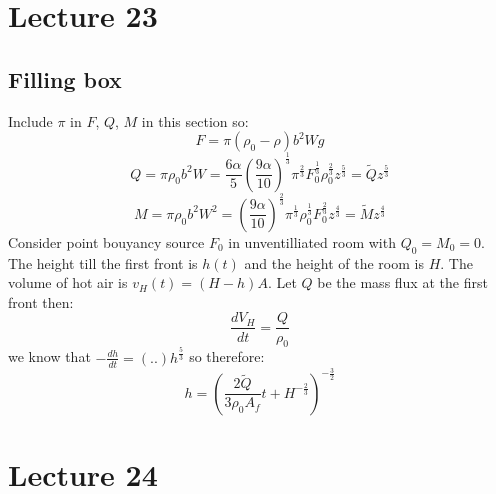 \documentclass{article}
\begin{document}
\section{Lecture 23}
\subsection{Filling box}
Include $\pi$ in $F$, $Q$, $M$ in this section so:
$$
 F= \pi ( \rho_0 - \rho) b^2 W g
$$
$$
 Q = \pi \rho_0 b^2 W = \frac{6 \alpha}{5} ( \frac{9 \alpha}{10})^{\frac{1}{3}} \pi^{\frac{2}{3}}F_0^{\frac{1}{3}} \rho_0^{ \frac{2}{3}} z^{\frac{5}{3}} = \tilde Q z^{\frac{5}{3}}
$$
$$
 M = \pi \rho_0 b^2 W^2 = ( \frac{9 \alpha}{10})^{\frac{2}{3}} \pi^{\frac{1}{3}} \rho_0^{\frac{1}{3}} F_0^{\frac{2}{3}} z^{\frac{4}{3}} = \tilde M z^{\frac{4}{3}}
$$
Consider point bouyancy source $F_0$ in unventilliated room with $Q_0  = M_0 = 0$. The height till the first front is $h(t)$ and the height of the room is $H$. The volume of hot air is $v_H(t) = (H-h)A$. Let $Q$ be the mass flux at the first front then:
$$
 \frac{d V_H}{dt} = \frac{Q}{\rho_0}
$$
we know that $- \frac{dh}{dt} = (..) h^{\frac{5}{3}}$ so therefore:
$$
h = ( \frac{2 \tilde Q}{3 \rho_0 A_f} t + H^{- \frac{2}{3}})^{-\frac{3}{2}}
$$
\section{Lecture 24}
\end{document}
